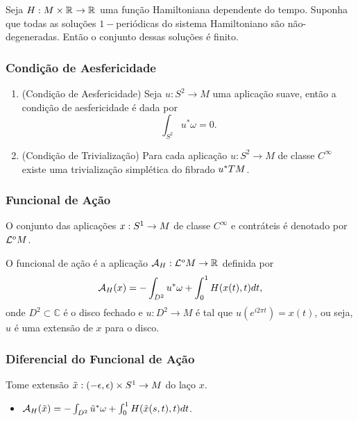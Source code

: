 \documentclass{beamer}
\begin{document}
\begin{footnotesize}
\begin{frame}
		\begin{proposicao}
			Seja $H:M\times\mathbb{R}^{}\to \mathbb{R}^{}$ uma função Hamiltoniana dependente do tempo. Suponha que todas as soluções $1-$periódicas do sistema Hamiltoniano são não-degeneradas. Então o conjunto dessas soluções é finito.
		\end{proposicao}
	\end{frame}

	\begin{frame}
		\frametitle{Condição de Aesfericidade}
			\begin{enumerate}
				
				\item (Condição de Aesfericidade) Seja $u:S^{2} \to M$ uma aplicação suave, então a condição de aesfericidade é dada por 
				$$
				\int_{S^{2}} u^{*}\omega = 0.
				$$
				
				\item (Condição de Trivialização) 
				Para cada aplicação $u:S^{2}\to M$ de classe $C^{\infty}$ existe uma trivialização simplética do fibrado $u^{*}TM$.
				
			\end{enumerate}
	\end{frame}
	
	\begin{frame}
		\frametitle{Funcional de Ação}
		
		O conjunto das aplicações $x:S^{1} \to M$ de classe $C^{\infty}$ e contráteis é denotado por $\mathcal{L}^{o}M$.
		
		\begin{definicao}
			O funcional de ação é a aplicação $\mathcal{A}_{H}: \mathcal{L}^{o}M\to \mathbb{R}^{}$ definida por
			$$
			\mathcal{A}_{H}(x) = -\int_{D^{2}}u^{*}\omega + \int_{0}^{1}H(x(t), t)dt,
			$$
			onde $D^{2} \subset \mathbb{C}$ é o disco fechado e $u:D^{2}\to M$ é tal que $u(e^{i2\pi t})=x(t)$, ou seja, $u$ é uma extensão de $x$ para o disco.
			
		\end{definicao}
	\end{frame}
	
	\begin{frame}
		\frametitle{Diferencial do Funcional de Ação}
		\begin{minipage}[t]{0.55\linewidth}
			Tome extensão 
			$
			\tilde{x}:(-\epsilon, \epsilon)\times S^{1} \to M
			$ do laço $x$.
			\begin{itemize}
				\item $
				\mathcal{A}_{H}(\tilde{x}) = -\int_{D^{2}}\tilde{u}^{*}\omega + \int_{0}^{1}H(\tilde{x}(s,t),t)dt
				$.
				

\end{itemize}
\end{minipage}
\end{frame}
\end{footnotesize}
\end{document}
